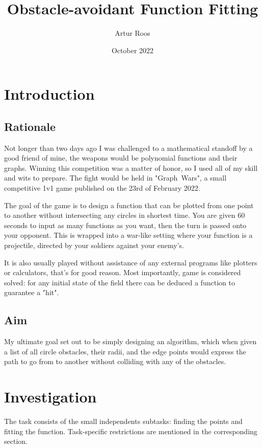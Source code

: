 \documentclass[12pt, titlepage]{article}
\title{Obstacle-avoidant Function Fitting}
\author{Artur Roos}
\date{October 2022}
\begin{document}
\maketitle
\tableofcontents

\section{Introduction}
\subsection{Rationale}
Not longer than two days ago I was challenged to a mathematical standoff by a 
good friend of mine, the weapons would be polynomial functions and their 
graphs. Winning this competition was a matter of honor, so I used all of my 
skill and wits to prepare. The fight would be held in \mbox{"Graph Wars"}, a 
small competitive 1v1 game published on the 23rd of February 2022. 

The goal of the game is to design a function that can be plotted from one point
to another without intersecting any circles in shortest time. You are given 
60 seconds to input as many functions as you want, then the turn is passed onto
your opponent.
This is wrapped into a war-like setting where your function is a projectile, 
directed by your soldiers against your enemy's.

It is also usually played without assistance of any external programs like 
plotters or calculators, that's for good reason. Most importantly, game is
considered solved: for any initial state of the field there can be deduced a 
function to guarantee a "hit". 

\subsection{Aim}
My ultimate goal  set out to be simply designing an algorithm, which when given
a list of all circle obstacles, their radii, and the edge points would express
the path to go from to another without colliding with any of the obstacles. 

\section{Investigation}
The task consists of the small independents subtasks: finding the points and 
fitting the function. Task-specific restrictions are mentioned in the 
corresponding section.
\end{document}
